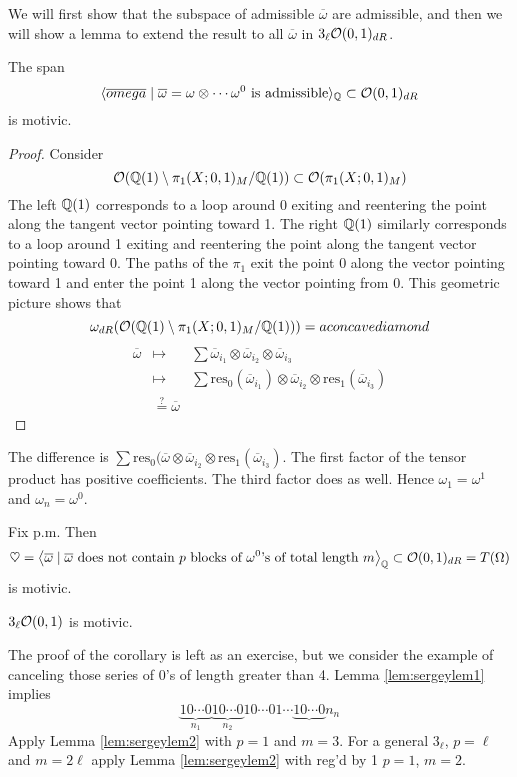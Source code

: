 We will first show that the subspace of admissible $\overline{\omega}$ are admissible, and then we will show a lemma to extend the result to all $\overline{\omega}$ in $3_{\ell} \mathcal{O}(0,1)_{dR}$.

\begin{lemma}\label{lem:sergeylem1}
The span
\[
\langle \overline{omega} \mid \overline{\omega} = \omega \otimes \cdots \omega^0 \textrm{~is admissible} \rangle_{\mathbb{Q}} \subset \mathcal{O}(0,1)_{dR}
\]
is motivic.
\end{lemma}
\begin{proof}
Consider
\[
\mathcal{O}(\mathbb{Q}(1) \setminus \pi_1(X;0,1)_M / \mathbb{Q}(1)) \subset \mathcal{O}(\pi_1(X;0,1)_M)
\]
The left $\mathbb{Q}(1)$ corresponds to a loop around 0 exiting and reentering the point along the tangent vector pointing toward 1. The right $\mathbb{Q}(1)$ similarly corresponds to a loop around 1 exiting and reentering the point along the tangent vector pointing toward 0. The paths of the $\pi_1$ exit the point 0 along the vector pointing toward 1 and enter the point 1 along the vector pointing from 0. This geometric picture shows that
\[
\omega_{dR}(\mathcal{O}(\mathbb{Q}(1) \setminus \pi_1(X;0,1)_M / \mathbb{Q}(1))) = a concave diamond
\]
\begin{eqnarray*}
\overline{\omega} & \mapsto & \sum \overline{\omega}_{i_1} \otimes \overline{\omega}_{i_2} \otimes \overline{\omega}_{i_3} \\
& \mapsto & \sum \mathrm{res}_0(\overline{\omega}_{i_1}) \otimes \overline{\omega}_{i_2} \otimes \mathrm{res}_1(\overline{\omega}_{i_3}) \\
& \stackrel{?}{=} \overline{\omega}
\end{eqnarray*}
\end{proof}
The difference is $\sum \mathrm{res}_0(\overline{\omega} \otimes \overline{\omega}_{i_2} \otimes \mathrm{res}_1(\overline{\omega}_{i_3})$. The first factor of the tensor product has positive coefficients. The third factor does as well. Hence $\omega_1 = \omega^1$ and $\omega_n = \omega^0$.
\begin{lemma}\label{lem:sergeylem2}
Fix p.m. Then
\[
\heartsuit = \left\langle \overline{\omega} \mid \textrm{$\overline{\omega}$ does not contain $p$ blocks of $\omega^0$'s of total length $m$} \right\rangle_{\mathbb{Q}} \subset \mathcal{O}(0,1)_{dR} = T(\Omega)
\]
is motivic.
\end{lemma}
\begin{cor}
$3_{\ell}\mathcal{O}(0,1)$ is motivic.
\end{cor}
The proof of the corollary is left as an exercise, but we consider the example of canceling those series of 0's of length greater than 4. Lemma \ref{lem:sergeylem1} implies
\[
\underbrace{10\cdots 0}_{n_1} \underbrace{10\cdots 0}_{n_2} 10 \cdots 01 \cdots \underbrace{10 \cdots 0}{n_n}
\]
Apply Lemma \ref{lem:sergeylem2} with $p=1$ and $m=3$. For a general $3_{\ell}$, $p=\ell$ and $m=2\ell$ apply Lemma \ref{lem:sergeylem2} with reg'd by 1 $p=1$, $m=2$.

